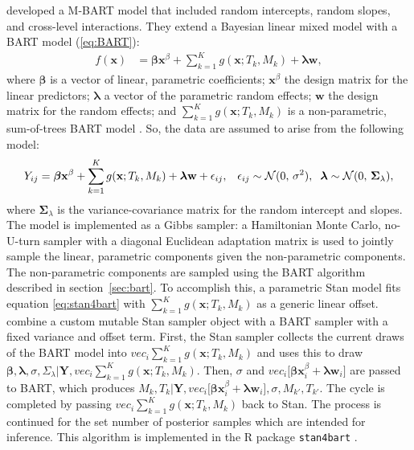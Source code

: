 \documentclass[3p,12pt,a4paper]{elsarticle}
\begin{document}
\citet{dorie2022} developed a M-BART model that included random intercepts, random slopes, and cross-level interactions. They extend a Bayesian linear mixed model with a BART model (\ref{eq:BART}):
\begin{align}
    \label{eq:stan4bart}
    f(\textbf{x}) &= \boldsymbol{\beta}\mathbf{x}^{\beta} + \sum^{K}_{k=1}g(\textbf{x}; T_{k}, M_{k}) + \boldsymbol{\lambda}\mathbf{w},
\end{align} where $\boldsymbol{\beta}$ is a vector of linear, parametric coefficients; $\mathbf{x}^{\beta}$ the design matrix for the linear predictors; $\boldsymbol{\lambda}$ a vector of the parametric random effects; $\mathbf{w}$ the design matrix for the random effects; and $\sum^{K}_{k=1}g(\textbf{x}; T_{k}, M_{k})$ is a non-parametric, sum-of-trees BART model \citep{dorie2022}. So, the data are assumed to arise from the following model:
\begin{align}
    \label{eq:stan4bart_model}
    Y_{ij} = \boldsymbol{\beta}\mathbf{x}^{\beta} + \sum^{K}_{k=1}g(\textbf{x}; T_{k}, M_{k}) + \boldsymbol{\lambda}\mathbf{w} + \epsilon_{ij}, & &\epsilon_{ij} \sim \mathcal{N}(0,\,\sigma^{2}), \hspace{.2cm} \boldsymbol{\lambda} \sim \mathcal{N}(0,\,\boldsymbol{\Sigma}_{\lambda}),
\end{align} where $\boldsymbol{\Sigma}_{\lambda}$ is the variance-covariance matrix for the random intercept and slopes. The model is implemented as a Gibbs sampler: a  Hamiltonian Monte Carlo, no-U-turn sampler with a diagonal Euclidean adaptation matrix is used to jointly sample the linear, parametric components given the non-parametric components. The non-parametric components are sampled using the BART algorithm described in section~\ref{sec:bart}. To accomplish this, a parametric Stan model \citep{lee2017} fits equation \ref{eq:stan4bart} with $\sum^{K}_{k=1}g(\textbf{x}; T_{k}, M_{k})$ as a generic linear offset. \citet{dorie2022} combine a custom mutable Stan sampler object with a BART sampler with a fixed variance and offset term. First, the Stan sampler collects the current draws of the BART model into $vec_i\sum^{K}_{k=1}g(\textbf{x}; T_{k}, M_{k})$ and uses this to draw $\mathbf{\beta}, \mathbf{\lambda}, \sigma, \Sigma_\lambda | \mathbf{Y}, vec_i\sum^{K}_{k=1}g(\textbf{x}; T_{k}, M_{k})$. Then, $\sigma$ and $vec_i\big[\boldsymbol{\beta}\mathbf{x}_i^{\beta} + \boldsymbol{\lambda}\mathbf{w}_i\big]$ are passed to BART, which produces $M_k,T_k | \mathbf{Y}, vec_i\big[\boldsymbol{\beta}\mathbf{x}_i^{\beta} + \boldsymbol{\lambda}\mathbf{w}_i\big], \sigma, M_{k'}, T_{k'}$. The cycle is completed by passing $vec_i\sum^{K}_{k=1}g(\textbf{x}; T_{k}, M_{k})$ back to Stan. The process is continued for the set number of posterior samples which are intended for inference. This algorithm is implemented in the R package \texttt{stan4bart} \citep{dorie2023a}.
\end{document}
